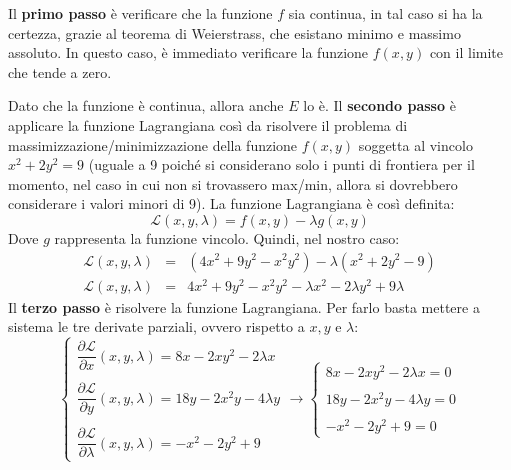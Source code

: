 \documentclass[a4paper]{article}
\begin{document}
	\noindent
	Il \textbf{primo passo} è verificare che la funzione $f$ sia continua, in tal caso si ha la certezza, grazie al teorema di Weierstrass, che esistano minimo e massimo assoluto. In questo caso, è immediato verificare la funzione $f\left(x,y\right)$ con il limite che tende a zero.\newline

	\noindent
	Dato che la funzione è continua, allora anche $E$ lo è. Il \textbf{secondo passo} è applicare la funzione Lagrangiana così da risolvere il problema di massimizzazione/minimizzazione della funzione $f\left(x,y\right)$ soggetta al vincolo $x^{2} + 2y^{2} = 9$ (uguale a 9 poiché si considerano solo i punti di frontiera per il momento, nel caso in cui non si trovassero max/min, allora si dovrebbero considerare i valori minori di 9). La funzione Lagrangiana è così definita:
	\begin{equation*}
		\mathcal{L}\left(x,y,\lambda\right) = f\left(x,y\right) - \lambda g\left(x,y\right)
	\end{equation*}
	Dove $g$ rappresenta la funzione vincolo. Quindi, nel nostro caso:
	\begin{equation*}
		\begin{array}{rcl}
			\mathcal{L}\left(x,y,\lambda\right) &=& \left(4x^{2} + 9y^{2} - x^{2}y^{2}\right) - \lambda\left(x^{2} + 2y^{2} - 9\right) \\ [.3em]
			\mathcal{L}\left(x,y,\lambda\right) &=& 4x^{2} + 9y^{2} - x^{2}y^{2} - \lambda x^{2} - 2 \lambda y^{2} + 9 \lambda
		\end{array}
	\end{equation*}
	Il \textbf{terzo passo} è risolvere la funzione Lagrangiana. Per farlo basta mettere a sistema le tre derivate parziali, ovvero rispetto a $x, y$ e $\lambda$:\
	\begin{equation*}
		\begin{cases}
			\dfrac{\partial \mathcal{L}}{\partial x}\left(x,y,\lambda\right) = 8x - 2xy^{2} - 2\lambda x \\
			\\
			\dfrac{\partial \mathcal{L}}{\partial y}\left(x,y,\lambda\right) = 18y - 2x^{2}y - 4 \lambda y \\
			\\
			\dfrac{\partial \mathcal{L}}{\partial \lambda}\left(x,y,\lambda\right) = -x^{2} - 2y^{2} + 9
		\end{cases}
		\longrightarrow
		\begin{cases}
			8x - 2xy^{2} - 2\lambda x = 0 \\
			\\
			18y - 2x^{2}y - 4 \lambda y = 0 \\
			\\
			-x^{2} - 2y^{2} + 9 = 0
		\end{cases}
	\end{equation*}
\end{document}
